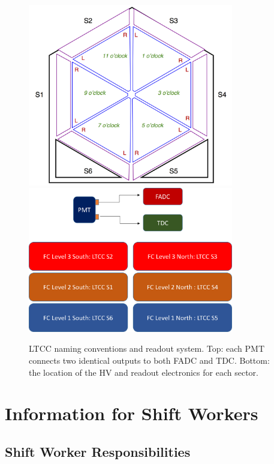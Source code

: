 \documentclass{article}
\begin{document}
\begin{figure}[ht]
  \centering
		\includegraphics[width=0.8\textwidth]{img/sectorScheme} \\
		\vspace{1cm}
		\includegraphics[width=0.8\textwidth]{img/readout}
		\caption{LTCC naming conventions and readout system.  Top: each PMT connects two identical outputs to both FADC and TDC. 
		 Bottom: the location of the HV and readout electronics for each sector. }
 		\label{fig:readout}
\end{figure}



\clearpage



\section{Information for Shift Workers}

\subsection{Shift Worker Responsibilities}
\end{document}
